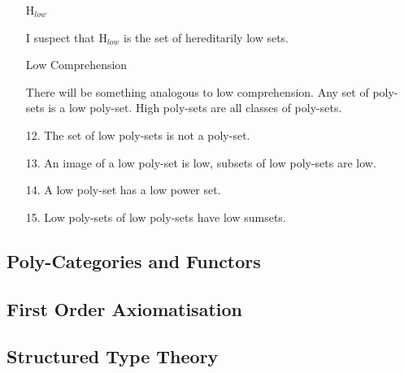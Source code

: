 \documentclass[numreferences]{rbjk}
\begin{document}
\begin{article}
\begin{itemize}
\begin{itemize}
\item[H$_{low}$]\ 

I suspect that H$_{low}$ is the set of hereditarily low sets.

\item[Low Comprehension]\ 

There will be something analogous to low comprehension.
Any set of poly-sets is a low poly-set.
High poly-sets are all classes of poly-sets.

\item[12.] The set of low poly-sets is not a poly-set.

\item[13.] An image of a low poly-set is low, subsets of low poly-sets are low.

\item[14.] A low poly-set has a low power set.

\item[15.] Low poly-sets of low poly-sets have low sumsets.

\end{itemize}
\end{itemize}

\subsection{Poly-Categories and Functors}

\subsection{First Order Axiomatisation}

\subsection{Structured Type Theory}

{\raggedright


} %


\end{article}
\end{document}
